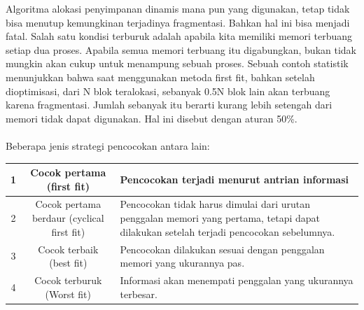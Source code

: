 Algoritma alokasi penyimpanan dinamis mana pun yang digunakan, tetap tidak bisa menutup kemungkinan terjadinya fragmentasi. Bahkan hal ini bisa menjadi fatal. Salah satu kondisi terburuk adalah apabila kita memiliki memori terbuang setiap dua proses. Apabila semua memori terbuang itu digabungkan, bukan tidak mungkin akan cukup untuk menampung sebuah proses. Sebuah contoh statistik menunjukkan bahwa saat menggunakan metoda first fit, bahkan setelah dioptimisasi, dari N blok teralokasi, sebanyak 0.5N blok lain akan terbuang karena fragmentasi. Jumlah sebanyak itu berarti kurang lebih setengah dari memori tidak dapat digunakan. Hal ini disebut dengan aturan 50\%.
\\
\\
Beberapa jenis strategi pencocokan antara lain:
\begin{table}[h!]
\centering
\begin{tabular}{ |c|c|l| }
\hline
1 & Cocok pertama (first fit) & Pencocokan terjadi menurut antrian informasi \\
\hline
2 & Cocok pertama berdaur (cyclical first fit) &  Pencocokan tidak harus dimulai dari urutan penggalan memori yang pertama, tetapi dapat dilakukan setelah terjadi pencocokan sebelumnya. \\
\hline
3 & Cocok terbaik (best fit) &  Pencocokan dilakukan sesuai dengan penggalan memori yang ukurannya pas. \\
\hline
4 & Cocok terburuk (Worst fit) & Informasi akan menempati penggalan yang ukurannya terbesar. \\
\hline
\end{tabular}
\end{table}
